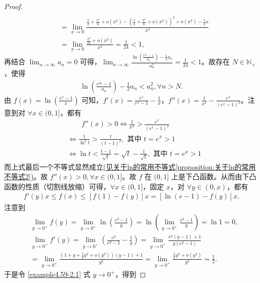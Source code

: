 \documentclass[lang=cn,newtx,10pt,scheme=chinese]{elegantbook}
\begin{document}
\begin{proof}
\begin{align*}
\\
&=\lim_{x\rightarrow 0} \frac{\frac{x}{2}+\frac{x^2}{6}+o(x^2)-\left( \frac{x}{2}+\frac{x^2}{6}+o(x^2) \right) ^2+o(x^2)-\frac{1}{2}x}{x^2}
\\
&=\lim_{x\rightarrow 0} \frac{\frac{x^2}{24}+o(x^2)}{x^2}=\frac{1}{24}<1,
\end{align*}
再结合 \(\lim_{n \to \infty} a_n = 0\) 可得，\(\lim_{n \to \infty} \frac{\ln\left(\frac{e^{a_n} - 1}{a_n}\right) - \frac{1}{2} a_n}{a_n^2} = \frac{1}{24} < 1\)。故存在 \(N \in \mathbb{N}_+\)，使得
\begin{align}
\ln\left(\frac{e^{a_n} - 1}{a_n}\right) - \frac{1}{2} a_n < a_n^2,\forall n > N. \label{example4.59-3.1}
\end{align}
由 \(f(x)=\ln\left(\frac{e^x - 1}{x}\right)\) 可知，\(f'(x)=\frac{e^x}{e^x - 1} - \frac{1}{x}\)，\(f''(x)=\frac{1}{x^2} - \frac{e^x}{(e^x - 1)^2}\)。注意到对 \(\forall x \in (0, 1]\)，都有
\begin{align*}
& \quad \quad f''(x) > 0 \Leftrightarrow \frac{1}{x^2} > \frac{e^x}{(e^x - 1)^2}\\
&\Leftrightarrow \frac{1}{\ln^2 t} > \frac{t}{(t - 1)^2},\text{ 其中 }t = e^x > 1\\
&\Leftrightarrow \ln t < \frac{t - 1}{\sqrt{t}} = \sqrt{t} - \frac{1}{\sqrt{t}},\text{ 其中 }t = e^x > 1
\end{align*}
而上式最后一个不等式显然成立\hyperref[proposition:关于ln的常用不等式2]{(见关于ln的常用不等式\ref{proposition:关于ln的常用不等式2})}。故 \(f''(x) > 0,\forall x \in (0, 1]\)。故 \(f\) 在 \((0, 1]\) 上是下凸函数。从而由下凸函数的性质（切割线放缩）可得，\(\forall x \in (0, 1]\)，固定 \(x\)，对 \(\forall y \in (0, x)\)，都有
\begin{align}
f'(y) x \leq f(x) \leq [f(1) - f(y)] x = [\ln(e - 1) - f(y)] x. \label{example4.59-2.1}
\end{align}
注意到
\begin{align*}
&\lim_{y \to 0^+} f(y) = \lim_{y \to 0^+} \ln\left(\frac{e^y - 1}{y}\right) = \ln\left(\lim_{y \to 0^+} \frac{e^y - 1}{y}\right) = \ln 1 = 0,\\
&\lim_{y \to 0^+} f'(y) = \lim_{y \to 0^+} \left(\frac{e^y}{e^y - 1} - \frac{1}{y}\right) = \lim_{y \to 0^+} \frac{e^y(y - 1) + 1}{y(e^y - 1)}\\
&= \lim_{y \to 0^+} \frac{(1 + y + \frac{1}{2} y^2 + o(y^2))(y - 1) + 1}{y^2} = \lim_{y \to 0^+} \frac{\frac{1}{2} y^2 + o(y^2)}{y^2} = \frac{1}{2}.
\end{align*}
于是令 \eqref{example4.59-2.1} 式 \(y \to 0^+\)，得到

\end{proof}
\end{document}
